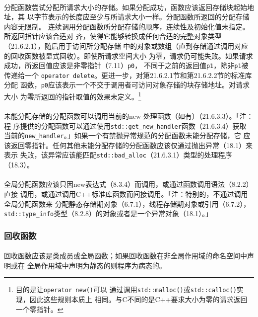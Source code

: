 \paragraph{}
分配函数尝试分配所请求大小的存储。如果分配成功，函数应该返回存储块起始地址，其
以字节表示的长度应至少与所请求大小一样。分配函数所返回的分配存储内容无限制。
连续调用分配函数所分配存储的顺序，连续性及初始化值未指定。所返回指针应该合适对
齐，使得它能够转换成任何合适的完整对象类型（21.6.2.1），随后用于访问所分配存储
中的对象或数组（直到存储通过调用对应的回收函数被显式回收）。即使所请求空间大小
为零，请求仍可能失败。如果请求成功，所返回值应该是非零指针（7.11）\texttt{p0}，
不同于之前的返回值\texttt{p1}，除非\texttt{p1}被传递给一个
\texttt{operator delete}。更进一步，对第21.6.2.1节和第21.6.2.2节的标准库分配
函数，\texttt{p0}应该表示一个不交于调用者可访问对象存储的块存储地址。对请求大小
为零所返回的指针取值的效果未定义。\footnote{目的是让\texttt{operator new()}可以
通过调用\texttt{std::malloc()}或\texttt{std::calloc()}实现，因此这些规则本质上
相同。与C不同的是C++要求大小为零的请求返回一个零指针。}

\paragraph{}
未能分配存储的分配函数可以调用当前的new-处理函数（如有）（21.6.3.3）。「注：程
序提供的分配函数可以通过使用\texttt{std::get\_new\_handler}函数（21.6.3.4）获取
当前的\texttt{new\_handler}。」如果一个有禁抛异常规范的分配函数未能分配存储，它
应该返回零指针。任何其他未能分配存储的分配函数应该仅通过抛出异常（18.1）来表示
失败，该异常应该能匹配\texttt{std::bad\_alloc}（21.6.3.1）类型的处理程序
（18.3）。

\paragraph{}
全局分配函数应该只因new表达式（8.3.4）而调用，或通过函数调用语法（8.2.2）直接
调用，或通过调用C++标准库函数而间接调用。「注：特别的，不通过调用全局分配函数来
分配静态存储期对象（6.7.1），线程存储期对象或引用（6.7.2），
\texttt{std::type\_info}类型（8.2.8）的对象或者是一个异常对象（18.1）。」

\subsubsection{回收函数}
\paragraph{}
回收函数应该是类成员或全局函数；如果回收函数在非全局作用域的命名空间中声明或在
全局作用域中声明为静态的则程序为病态的。

